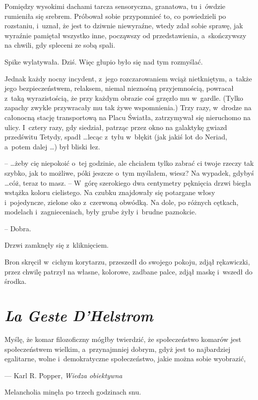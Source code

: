 \documentclass[oneside,polish,11pt,rmheadings]{mwbk}
\begin{document}
Pomiędzy wysokimi dachami tarcza sensoryczna, granatowa, tu i~ówdzie rumieniła się srebrem. Próbował sobie przypomnieć to, co powiedzieli po rozstaniu, i~uznał, że jest to dziwnie niewyraźne, wtedy zdał sobie sprawę, jak wyraźnie pamiętał wszystko inne, począwszy od przedstawienia, a~skończywszy na chwili, gdy spleceni ze sobą spali. 

Spike wylatywała. Dziś. Więc głupio było się nad tym rozmyślać. 

Jednak każdy nocny incydent, z~jego rozczarowaniem wciąż nietkniętym, a~także jego bezpieczeństwem, relaksem, niemal nieznośną przyjemnością, powracał z~taką wyrazistością, że przy każdym obrazie coś grzęzło mu w~gardle. (Tylko zapachy zwykle przywracały mu tak żywe wspomnienia.) Trzy razy, w~drodze na całonocną stację transportową na Placu Światła, zatrzymywał się nieruchomo na ulicy. I~cztery razy, gdy siedział, patrząc przez okno na galaktykę gwiazd przedświtu Tetydy, spadł \ldots   lecąc z~tyłu w~błękit (jak jakiś lot do Neriad, a~potem dalej \ldots ) był bliski łez. 

--  \ldots żeby cię niepokoić o~tej godzinie, ale chciałem tylko zabrać ci twoje rzeczy tak szybko, jak to możliwe, póki jeszcze o~tym myślałem, wiesz? Na wypadek, gdybyś \ldots  cóż, teraz to masz. -- W~górę szerokiego dwa centymetry pęknięcia drzwi biegła wstążka koloru cielistego. Na czubku znajdowały się potargane włosy i~pojedyncze, zielone oko z~czerwoną obwódką. Na dole, po różnych cętkach, modelach i~zagnieceniach, były grube żyły i~brudne paznokcie. 

-- Dobra. 

Drzwi zamknęły się z~kliknięciem. 

Bron skręcił w~cichym korytarzu, przeszedł do swojego pokoju, zdjął rękawiczki, przez chwilę patrzył na własne, kolorowe, zadbane palce, zdjął maskę i~wszedł do środka. 

\chapter{\textit{La Geste D'Helstrom}}

Myślę, że komar filozoficzny mógłby twierdzić, że społeczeństwo komarów jest społeczeństwem wielkim, a~przynajmniej dobrym, gdyż jest to najbardziej egalitarne, wolne i~demokratyczne społeczeństwo, jakie można sobie wyobrazić, 
 
 \smallskip
\noindent --- Karl R. Popper, \textit{Wiedza obiektywna}

\bigskip
Melancholia minęła po trzech godzinach snu. 
\end{document}
